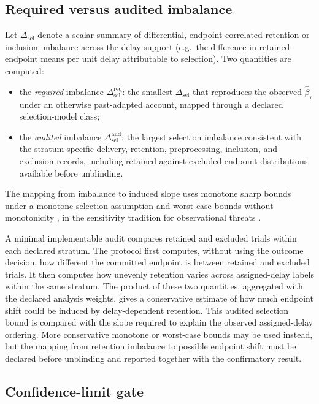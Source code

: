 \documentclass[11pt,a4paper]{article}
\theoremstyle{definition}
\begin{document}
\subsection{Required versus audited imbalance}
\label{sec:si-required-audited}

Let \(\Delta_{\mathrm{sel}}\) denote a scalar summary of differential,
endpoint-correlated retention or inclusion imbalance across the delay support
(e.g.\ the difference in retained-endpoint means per unit delay attributable to
selection). Two quantities are computed:
\begin{itemize}[leftmargin=1.4em,itemsep=2pt]
\item the \textit{required} imbalance
\(\Delta_{\mathrm{sel}}^{\mathrm{req}}\): the smallest
\(\Delta_{\mathrm{sel}}\) that reproduces the observed
\(\widehat{\beta}_\tau\) under an otherwise past-adapted account, mapped through a
declared selection-model class;
\item the \textit{audited} imbalance
\(\Delta_{\mathrm{sel}}^{\mathrm{aud}}\): the largest selection imbalance
consistent with the stratum-specific delivery, retention, preprocessing,
inclusion, and exclusion records, including retained-against-excluded endpoint
distributions available before unblinding.
\end{itemize}
The mapping from imbalance to induced slope uses monotone sharp bounds under a
monotone-selection assumption \citep{Lee2009} and worst-case bounds without
monotonicity \citep{Manski1990}, in the sensitivity tradition for observational
threats \citep{Rosenbaum2002}.

A minimal implementable audit compares retained and excluded trials within each
declared stratum. The protocol first computes, without using the outcome
decision, how different the committed endpoint is between retained and excluded
trials. It then computes how unevenly retention varies across assigned-delay
labels within the same stratum. The product of these two quantities, aggregated
with the declared analysis weights, gives a conservative estimate of how much
endpoint shift could be induced by delay-dependent retention. This audited
selection bound is compared with the slope required to explain the observed
assigned-delay ordering. More conservative monotone or worst-case bounds may be
used instead, but the mapping from retention imbalance to possible endpoint
shift must be declared before unblinding and reported together with the
confirmatory result.

\subsection{Confidence-limit gate}
\label{sec:si-gate}
\end{document}
